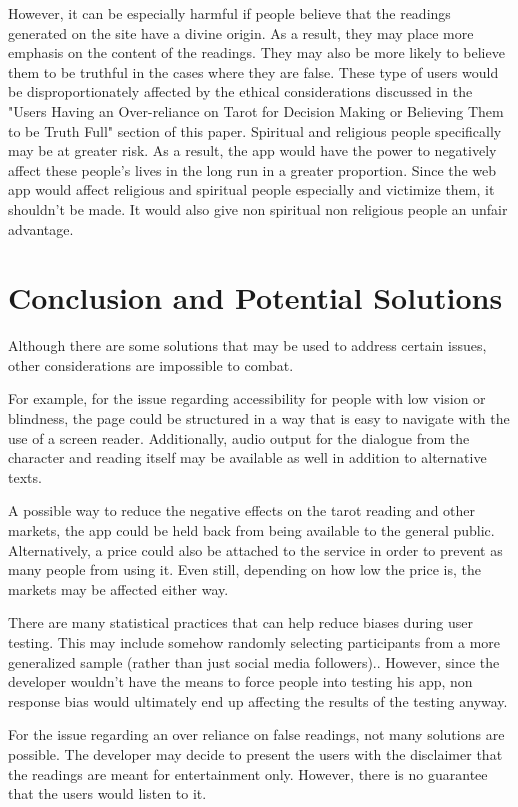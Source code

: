 \documentclass[10pt,twocolumn]{article}
\begin{document}
However, it can be especially harmful if people believe that the readings generated on the site have a divine origin. As a result, they may place more emphasis on the content of the readings. They may also be more likely to believe them to be truthful in the cases where they are false. These type of users would be disproportionately affected by the ethical considerations discussed in the "Users Having an Over-reliance on Tarot for Decision Making or Believing Them to be Truth Full" section of this paper. Spiritual and religious people specifically may be at greater risk. As a result, the app would have the power to negatively affect these people's lives in the long run in a greater proportion. 
Since the web app would affect religious and spiritual people especially and victimize them, it shouldn't be made. It would also give non spiritual non religious people an unfair advantage. 



\section{Conclusion and Potential Solutions}
Although there are some solutions that may be used to address certain issues, other considerations are impossible to combat. 

For example, for the issue regarding accessibility for people with low vision or blindness, the page could be structured in a way that is easy to navigate with the use of a screen reader.\cite{institute} Additionally, audio output for the dialogue from the character and reading itself may be available as well in addition to alternative texts.

A possible way to reduce the negative effects on the tarot reading and other markets, the app could be held back from being available to the general public. Alternatively, a price could also be attached to the service in order to prevent as many people from using it. Even still, depending on how low the price is, the markets may be affected either way.

There are many statistical practices that can help reduce biases during user testing. This may include somehow randomly selecting participants from a more generalized sample (rather than just social media followers).\cite{hayes_2022}. However, since the developer wouldn't have the means to force people into testing his app, non response bias would ultimately end up affecting the results of the testing anyway. 

For the issue regarding an over reliance on false readings, not many solutions are possible. The developer may decide to present the users with the disclaimer that the readings are meant for entertainment only. However, there is no guarantee that the users would listen to it. 
\end{document}
